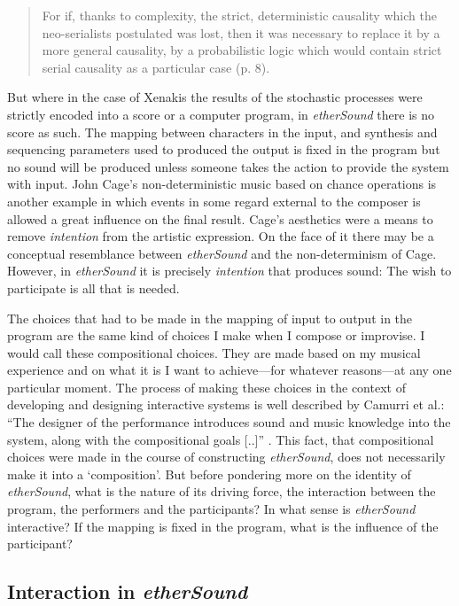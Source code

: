 \begin{quote}
  For if, thanks to complexity, the strict, deterministic causality   which the neo-serialists postulated was lost, then it was necessary   to replace it by a more general causality, by a probabilistic logic   which would contain strict serial causality as a particular case   (p. 8). 
\end{quote}

But where in the case of Xenakis the results of the stochastic processes were strictly encoded into a score or a computer program, in \emph{etherSound} there is no score as such. The mapping between characters in the input, and synthesis and sequencing parameters used to produced the output is fixed in the program but no sound will be produced unless someone takes the action to provide the system with input. John Cage's non-deterministic music based on chance operations is another example in which events in some regard external to the composer is allowed a great influence on the final result. Cage's aesthetics were a means to remove \textit{intention} from the artistic expression. On the face of it there may be a conceptual resemblance between \emph{etherSound} and the non-determinism of Cage. However, in \emph{etherSound} it is precisely \textit{intention} that produces sound: The wish to participate is all that is needed. 

The choices that had to be made in the mapping of input to output in the program are the same kind of choices I make when I compose or improvise. I would call these compositional choices. They are made based on my musical experience and on what it is I want to achieve---for whatever reasons---at any one particular moment. The process of making these choices in the context of developing and designing interactive systems is well described by Camurri et al.: ``The designer of the performance introduces sound and music knowledge into the system, along with the compositional goals [..]'' \citep[Camurri, Richetti, and Trocca, 1999, as cited in][p. 373]{rowe01}. This fact, that compositional choices were made in the course of constructing \emph{etherSound}, does not necessarily make it into a `composition'. But before pondering more on the identity of \emph{etherSound}, what is the nature of its driving force, the interaction between the program, the performers and the participants? In what sense is \emph{etherSound} interactive? If the mapping is fixed in the program, what is the influence of the participant? 

\subsection{Interaction in \emph{etherSound}}
\label{sec:inter-emph}

